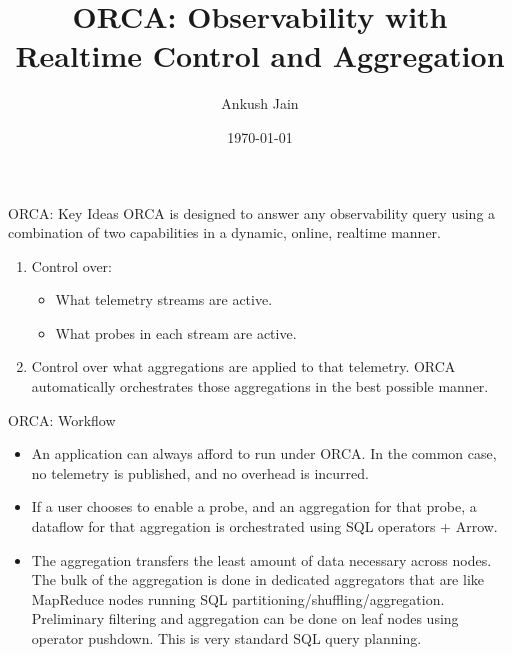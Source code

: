 \documentclass{beamer}
\title{ORCA: Observability with Realtime Control and Aggregation}
\author[Left Text]{Ankush Jain}
\institute{CMU}
\date{\today}
\begin{document}
\begin{frame}
  \titlepage %
\end{frame}

\begin{frame}{ORCA: Key Ideas}
  ORCA is designed to answer any observability query using a combination of two capabilities in a dynamic, online, realtime manner.

  \begin{enumerate}
    \item Control over:
      \begin{itemize}
        \item What telemetry streams are active.
        \item What probes in each stream are active.
      \end{itemize}
    \item Control over what aggregations are applied to that telemetry. ORCA automatically orchestrates those aggregations in the best possible manner.
  \end{enumerate}
\end{frame}

\begin{frame}{ORCA: Workflow}
  \begin{itemize}
  \item An application can always afford to run under ORCA. In the common case, no telemetry is published, and no overhead is incurred.

  \item If a user chooses to enable a probe, and an aggregation for that probe, a dataflow for that aggregation is orchestrated using SQL operators + Arrow.

  \item The aggregation transfers the least amount of data necessary across nodes. The bulk of the aggregation is done in dedicated aggregators that are like MapReduce nodes running SQL partitioning/shuffling/aggregation. Preliminary filtering and aggregation can be done on leaf nodes using operator pushdown. This is very standard SQL query planning.
\end{itemize}
\end{frame}
\end{document}
